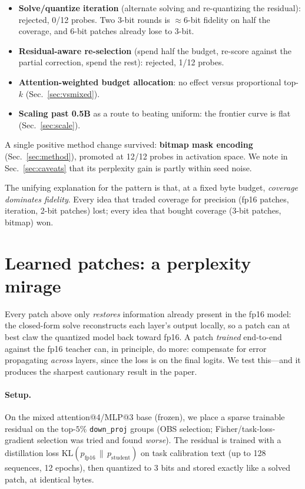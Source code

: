 \documentclass[11pt]{article}
\newcommand{\code}[1]{\texttt{#1}}
\begin{document}
\begin{itemize}
  \item \textbf{Solve/quantize iteration} (alternate solving and re-quantizing
    the residual): rejected, 0/12 probes. Two 3-bit rounds is $\approx$6-bit
    fidelity on half the coverage, and 6-bit patches already lose to 3-bit.
  \item \textbf{Residual-aware re-selection} (spend half the budget, re-score
    against the partial correction, spend the rest): rejected, 1/12 probes.
  \item \textbf{Attention-weighted budget allocation}: no effect versus
    proportional top-$k$ (Sec.~\ref{sec:vsmixed}).
  \item \textbf{Scaling past 0.5B} as a route to beating uniform: the frontier
    curve is flat (Sec.~\ref{sec:scale}).
\end{itemize}

A single positive method change survived: \textbf{bitmap mask encoding}
(Sec.~\ref{sec:method}), promoted at 12/12 probes in activation space. We note
in Sec.~\ref{sec:caveats} that its perplexity gain is partly within seed noise.

The unifying explanation for the pattern is that, at a fixed byte budget,
\emph{coverage dominates fidelity}. Every idea that traded coverage for
precision (fp16 patches, iteration, 2-bit patches) lost; every idea that bought
coverage (3-bit patches, bitmap) won.

\section{Learned patches: a perplexity mirage}
\label{sec:learned}

Every patch above only \emph{restores} information already present in the fp16
model: the closed-form solve reconstructs each layer's output locally, so a
patch can at best claw the quantized model back toward fp16. A patch
\emph{trained} end-to-end against the fp16 teacher can, in principle, do more:
compensate for error propagating \emph{across} layers, since the loss is on the
final logits. We test this---and it produces the sharpest cautionary result in
the paper.

\paragraph{Setup.} On the mixed attention@4/MLP@3 base (frozen), we place a
sparse trainable residual on the top-$5\%$ \code{down\_proj} groups (OBS
selection; Fisher/task-loss-gradient selection was tried and found
\emph{worse}). The residual is trained with a distillation loss
$\mathrm{KL}(p_\text{fp16}\,\|\,p_\text{student})$ on task calibration text
(up to 128 sequences, 12 epochs), then quantized to 3 bits and stored exactly
like a solved patch, at identical bytes.
\end{document}
